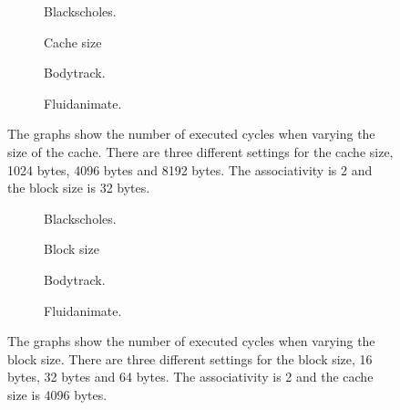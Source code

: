 \begin{figure}[H]
    \centering
    \begin{subfigure}[b]{0.33\textwidth}
        \centering
        \caption{Blackscholes.}
        \label{fig:cache_size_blackscholes_advanced}
    \end{subfigure}%
    \hfill
    \begin{subfigure}[b]{0.33\textwidth}
        \centering
        Cache size\par\medskip
        \caption{Bodytrack.}
        \label{fig:cache_size_bodytrack_advanced}
    \end{subfigure}%
    \hfill
    \begin{subfigure}[b]{0.33\textwidth}
        \centering
        \caption{Fluidanimate.}
        \label{fig:cache_size_fluidanimate_advanced}
    \end{subfigure}
    \hfill
    \caption{The graphs show the number of executed cycles when varying the size of the cache. There are three different settings for the cache size, 1024 bytes, 4096 bytes and 8192 bytes. The associativity is 2 and the block size is 32 bytes.}
    \label{fig:cache_size_advanced}
\end{figure}

\begin{figure}[H]
    \centering
    \begin{subfigure}[b]{0.33\textwidth}
        \centering
        \caption{Blackscholes.}
        \label{fig:block_size_blackscholes_advanced}
    \end{subfigure}%
    \hfill
    \begin{subfigure}[b]{0.33\textwidth}
        \centering
        Block size\par\medskip
        \caption{Bodytrack.}
        \label{fig:block_size_bodytrack_advanced}
    \end{subfigure}%
    \hfill
    \begin{subfigure}[b]{0.33\textwidth}
        \centering
        \caption{Fluidanimate.}
        \label{fig:block_size_fluidanimate_advanced}
    \end{subfigure}
    \hfill
    \caption{The graphs show the number of executed cycles when varying the block size. There are three different settings for the block size, 16 bytes, 32 bytes and 64 bytes. The associativity is 2 and the cache size is 4096 bytes.}
    \label{fig:block_size_advanced}
\end{figure}


